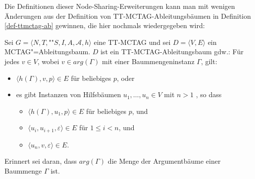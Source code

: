 Die Definitionen dieser Node-Sharing-Erweiterungen kann man mit wenigen Änderungen aus der Definition von TT-MCTAG-Ableitungsbäumen in Definition \ref{def-ttmctag-ab} gewinnen, die hier nochmals wiedergegeben wird:  
\begin{definition}
Sei $G = \langle N,T,$""$S,I,A,\mathcal{A},h \rangle$ eine TT-MCTAG und sei $D=\langle V,E \rangle$ ein MCTAG"=Ableitungsbaum. \linebreak $D$ ist ein TT-MCTAG-Ablei\-tungs\-baum gdw.:
Für jedes $v \in V$, wobei $v \in arg(\Gamma)$ mit einer Baummengeninstanz $\Gamma$, gilt:
\begin{itemize} 
  \item $\langle h(\Gamma),v,p \rangle \in E$ für beliebiges $p$, oder
  \item es gibt Instanzen von Hilfsbäumen $u_1, \ldots, u_n \in V$ mit $n>1$ , so dass
  \begin{itemize}
    \item $\langle h(\Gamma),u_1,p \rangle \in E$ für beliebiges $p$, und
    \item $\langle u_i,u_{i+1},\varepsilon \rangle \in E$ für $1 \leq i < n$, und
    \item $\langle u_n,v,\varepsilon \rangle \in E$.
  \end{itemize}
\end{itemize}  
\end{definition}
Erinnert sei daran, dass $arg(\Gamma)$ die Menge der Argumentbäume einer Baummenge $\Gamma$ ist.\largerpage%

